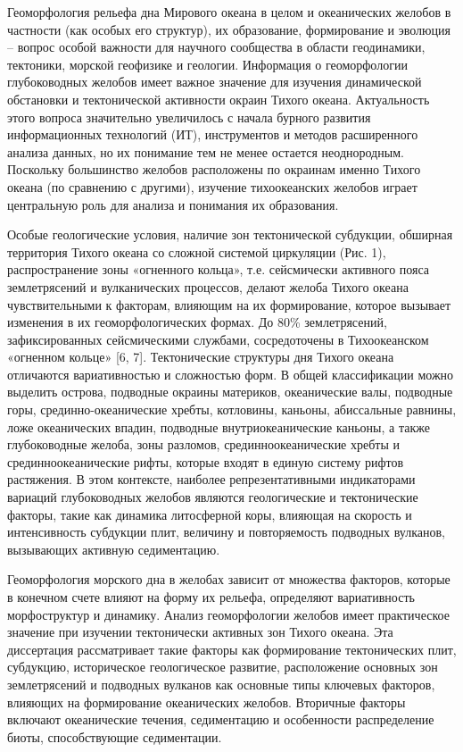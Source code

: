 {\influence} Геоморфология рельефа дна Мирового океана в целом и океанических желобов в частности (как особых его структур), их образование, формирование и эволюция – вопрос особой важности для научного сообщества в области геодинамики, тектоники, морской геофизике и геологии. Информация о геоморфологии глубоководных  желобов имеет важное значение для изучения динамической обстановки и тектонической активности окраин Тихого океана. Актуальность этого вопроса значительно увеличилось с начала бурного развития информационных технологий (ИТ), инструментов и методов расширенного анализа данных, но их понимание тем не менее остается неоднородным. Поскольку большинство желобов расположены по окраинам именно Тихого океана (по сравнению с другими), изучение тихоокеанских желобов играет центральную роль для анализа и понимания их образования. 

Особые геологические условия, наличие зон тектонической субдукции, обширная территория Тихого океана со сложной системой циркуляции (Рис. 1), распространение зоны «огненного кольца», т.е. сейсмически активного пояса землетрясений и вулканических процессов, делают желоба Тихого океана чувствительными к факторам, влияющим на их формирование, которое вызывает изменения в их геоморфологических формах. До 80\% землетрясений, зафиксированных сейсмическими службами, сосредоточены в Тихоокеанском «огненном кольце» [6, 7]. Тектонические структуры дня Тихого океана отличаются вариативностью и сложностью форм. В общей классификации можно выделить острова, подводные окраины материков, океанические валы, подводные горы, срединно-океанические хребты, котловины, каньоны, абиссальные равнины, ложе океанических впадин, подводные внутриокеанические каньоны, а также глубоководные желоба, зоны разломов, срединноокеанические хребты и срединноокеанические рифты, которые входят в единую систему рифтов растяжения. В этом контексте, наиболее репрезентативными индикаторами вариаций глубоководных желобов являются геологические и тектонические факторы, такие как динамика литосферной коры, влияющая на скорость и интенсивность субдукции плит, величину и повторяемость подводных вулканов, вызывающих активную седиментацию. 

Геоморфология морского дна в желобах зависит от множества факторов, которые в конечном счете влияют на форму их рельефа, определяют вариативность морфоструктур и динамику. Анализ геоморфологии желобов имеет практическое значение при изучении тектонически активных зон Тихого океана. Эта диссертация рассматривает такие факторы как формирование тектонических плит, субдукцию, историческое геологическое развитие, расположение основных зон землетрясений и подводных вулканов как основные типы ключевых факторов, влияющих на формирование океанических желобов. Вторичные факторы включают океанические течения, седиментацию и особенности распределение биоты, способствующие седиментации. 

